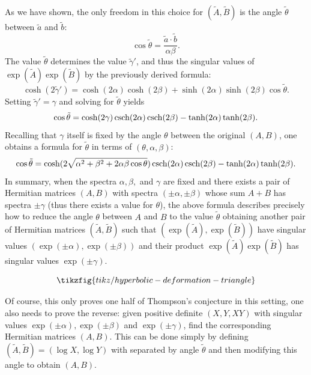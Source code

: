 \documentclass[notitlepage]{article}
\begin{document}
As we have shown, the only freedom in this choice for $(\tilde A, \tilde B)$ is the angle $\tilde \theta$ between $\tilde a$ and $\tilde b$: 
\begin{equation}
    \cos \tilde \theta = \frac{\tilde a \cdot \tilde b}{\alpha \beta}.
\end{equation}
The value $\tilde \theta$ determines the value $\tilde \gamma'$, and thus the singular values of $\exp(\tilde A)\exp(\tilde B)$ by the previously derived formula:
\begin{equation}
    \cosh(2 \tilde \gamma') = \cosh(2 \alpha) \cosh(2 \beta) + \sinh (2\alpha) \sinh (2\beta)\cos \tilde \theta.
\end{equation}
Setting $\tilde \gamma' = \gamma$ and solving for $\tilde \theta$ yields
\begin{equation}
    \cos \tilde \theta = \cosh(2 \gamma)\operatorname{csch} (2\alpha) \operatorname{csch} (2\beta)-\tanh(2\alpha)\tanh(2\beta).
\end{equation}
Recalling that $\gamma$ itself is fixed by the angle $\theta$ between the original $(A,B)$, one obtains a formula for $\tilde \theta$ in terms of $(\theta, \alpha, \beta)$:
\begin{equation}
    \cos \tilde \theta = \cosh(2 \sqrt{\alpha^2+\beta^2+2\alpha\beta\cos \theta})\operatorname{csch} (2\alpha) \operatorname{csch} (2\beta)-\tanh(2\alpha)\tanh(2\beta).
\end{equation}
In summary, when the spectra $\alpha, \beta,$ and $\gamma$ are fixed and there exists a pair of Hermitian matrices $(A,B)$ with spectra $(\pm \alpha, \pm \beta)$ whose sum $A+B$ has spectra $\pm \gamma$ (thus there exists a value for $\theta$), the above formula describes precisely how to reduce the angle $\theta$ between $A$ and $B$ to the value $\tilde \theta$ obtaining another pair of Hermitian matrices $(\tilde A, \tilde B)$ such that $(\exp(\tilde A), \exp(\tilde B))$ have singular values $(\exp(\pm \alpha), \exp(\pm \beta))$ and their product $\exp(\tilde A)\exp(\tilde B)$ has singular values $\exp(\pm \gamma)$.

\begin{equation}
    \tikzfig{tikz/hyperbolic-deformation-triangle}
\end{equation}

Of course, this only proves one half of Thompson's conjecture in this setting, one also needs to prove the reverse: given positive definite $(X,Y, XY)$ with singular values $\exp(\pm\alpha),\exp(\pm\beta)$ and $\exp(\pm\gamma)$, find the corresponding Hermitian matrices $(A,B)$.
This can be done simply by defining $(\tilde A, \tilde B) = (\log X, \log Y)$ with separated by angle $\tilde \theta$ and then modifying this angle to obtain $(A, B)$.
\end{document}
